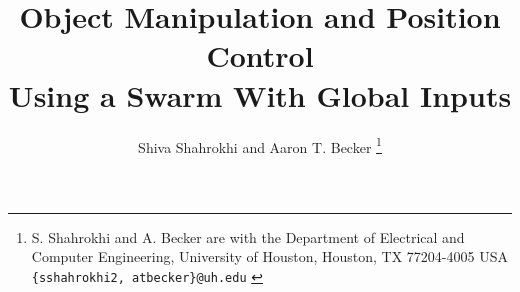 \documentclass[letterpaper, 10 pt, conference]{ieeeconf}
\begin{document}


\title{\LARGE \bf 
Object Manipulation and Position Control \\Using a Swarm With Global Inputs
}
\author{Shiva Shahrokhi and  Aaron T. Becker%
\thanks{{S. Shahrokhi and A. Becker are with the Department of Electrical and Computer Engineering,  University of Houston, Houston, TX 77204-4005 USA {\tt\small  \{sshahrokhi2, atbecker\}@uh.edu}
}
} %
} %
\maketitle
\end{document}

